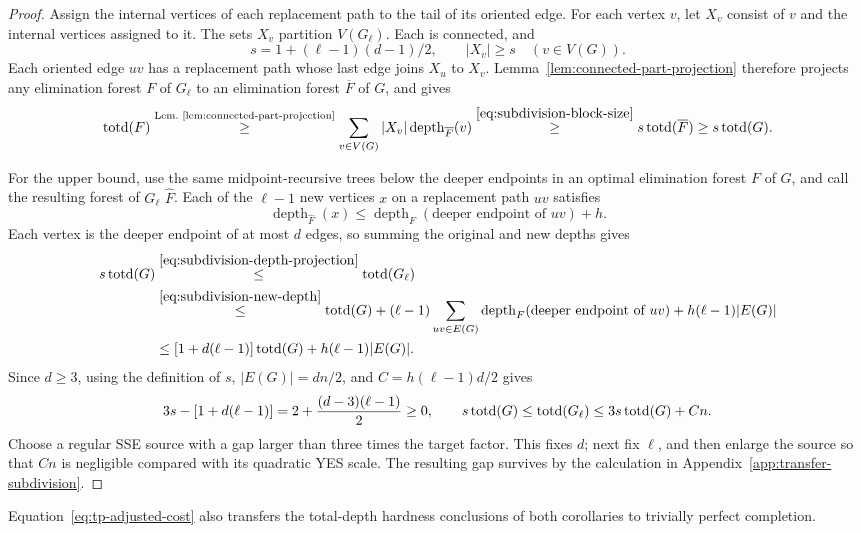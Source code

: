 \begin{proof}
Assign the internal vertices of each replacement path to the tail
of its oriented edge. For each vertex $v$, let $X_v$ consist of $v$
and the internal vertices assigned to it. The sets $X_v$ partition
$V(G_\ell)$. Each is connected, and
\begin{equation}\label{eq:subdivision-block-size}
 s=1+(\ell-1)(d-1)/2,\qquad |X_v|\ge s\quad(v\in V(G)).
\end{equation}
Each oriented edge $uv$ has a replacement path whose last edge
joins $X_u$ to $X_v$. Lemma~\ref{lem:connected-part-projection}
therefore projects any elimination forest $F$ of $G_\ell$ to an
elimination forest $\overline F$ of $G$, and gives
\begin{equation}\label{eq:subdivision-depth-projection}
 \operatorname{totd}(F)
 \overset{\text{Lem.~\ref{lem:connected-part-projection}}}{\ge}
 \sum_{v\in V(G)}|X_v|\operatorname{depth}_{\overline F}(v)
 \overset{\eqref{eq:subdivision-block-size}}{\ge}
 s\operatorname{totd}(\overline F)\ge s\operatorname{totd}(G).
\end{equation}

For the upper bound, use the same midpoint-recursive trees below the
deeper endpoints in an optimal elimination forest $F$ of $G$, and call
the resulting forest of $G_\ell$ $\widehat F$. Each of the
$\ell-1$ new vertices $x$ on a replacement path $uv$ satisfies
\begin{equation}\label{eq:subdivision-new-depth}
 \operatorname{depth}_{\widehat F}(x)\le
 \operatorname{depth}_F(\text{deeper endpoint of }uv)+h.
\end{equation}
Each vertex is the deeper endpoint of at
most $d$ edges, so summing the original and new depths gives
\[
\begin{aligned}
 s\operatorname{totd}(G)
 &\overset{\eqref{eq:subdivision-depth-projection}}{\leq}
 \operatorname{totd}(G_\ell)\\
 &\overset{\eqref{eq:subdivision-new-depth}}{\leq}
 \operatorname{totd}(G)+(\ell-1)\sum_{uv\in E(G)}
       \operatorname{depth}_{F}(\text{deeper endpoint of }uv)
       +h(\ell-1)|E(G)|\\
 &\leq
 [1+d(\ell-1)]\operatorname{totd}(G)+h(\ell-1)|E(G)|.
\end{aligned}
\]
Since $d\geq3$, using the definition of $s$, $|E(G)|=dn/2$,
and $C=h(\ell-1)d/2$ gives
\[
 3s-[1+d(\ell-1)]=2+\frac{(d-3)(\ell-1)}2\geq0,\qquad
 s\operatorname{totd}(G)\leq\operatorname{totd}(G_\ell)\leq3s\operatorname{totd}(G)+Cn.
\]
Choose a regular SSE source with a gap larger than three times
the target factor. This fixes $d$; next fix $\ell$, and then enlarge
the source so that $Cn$ is negligible compared with its quadratic
YES scale. The resulting gap survives by the calculation in
Appendix~\ref{app:transfer-subdivision}.

\end{proof}

Equation~\eqref{eq:tp-adjusted-cost} also transfers the total-depth
hardness conclusions of both corollaries to trivially perfect
completion.
